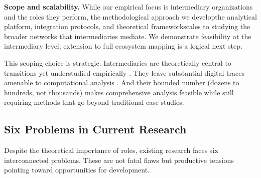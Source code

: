 \documentclass[../main.tex]{subfiles}
\begin{document}
\begin{importantbox}
\textbf{Scope and scalability.} While our empirical focus is intermediary organizations and the roles they perform, the methodological approach we develop\textemdash the analytical platform, integration protocols, and theoretical framework\textemdash scales to studying the broader networks that intermediaries mediate. We demonstrate feasibility at the intermediary level; extension to full ecosystem mapping is a logical next step.
\end{importantbox}

This scoping choice is strategic. Intermediaries are theoretically central to transitions yet understudied empirically \cite{howells2006intermediation,vanLente2003roles}. They leave substantial digital traces amenable to computational analysis \cite{salganik2019bitbybit}. And their bounded number (dozens to hundreds, not thousands) makes comprehensive analysis feasible while still requiring methods that go beyond traditional case studies.

\subsection{Six Problems in Current Research}

Despite the theoretical importance of roles, existing research faces six interconnected problems. These are not fatal flaws but productive tensions pointing toward opportunities for development.
\end{document}
